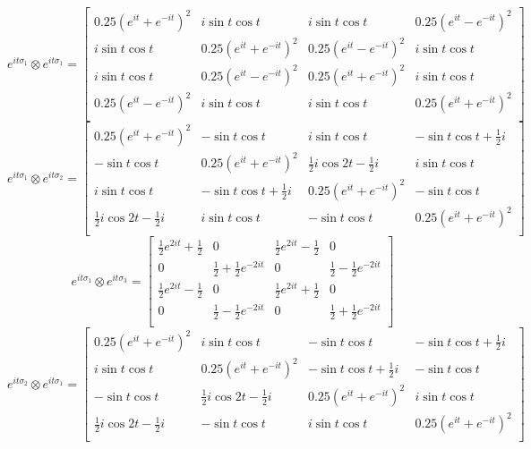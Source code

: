 \documentclass{article}
\begin{document}
\[ e^{it\sigma_1} \otimes e^{it\sigma_1} =  \left[
    \begin{array}{cccc}
    0.25(e^{it} + e^{-it})^2 & i\sin{t}\cos{t} & i\sin{t}\cos{t} & 0.25(e^{it} - e^{-it})^2 \\
    i\sin{t}\cos{t} & 0.25(e^{it} + e^{-it})^2 & 0.25(e^{it} - e^{-it})^2 & i\sin{t}\cos{t} \\
    i\sin{t}\cos{t} & 0.25(e^{it} - e^{-it})^2 & 0.25(e^{it} + e^{-it})^2 & i\sin{t}\cos{t} \\
    0.25(e^{it} - e^{-it})^2 & i\sin{t}\cos{t} & i\sin{t}\cos{t} & 0.25(e^{it} + e^{-it})^2 \\
    \end{array}
    \right]  \]
\[ e^{it\sigma_1} \otimes e^{it\sigma_2} = \left[
    \begin{array}{cccc}
    0.25(e^{it} + e^{-it})^2 & -\sin{t}\cos{t} & i\sin{t}\cos{t} & -\sin{t}\cos{t} + \frac{1}{2}i \\
    -\sin{t}\cos{t} & 0.25(e^{it} + e^{-it})^2 & \frac{1}{2}i\cos{2t} - \frac{1}{2}i & i\sin{t}\cos{t} \\
    i\sin{t}\cos{t} & -\sin{t}\cos{t} + \frac{1}{2}i & 0.25(e^{it} + e^{-it})^2 & -\sin{t}\cos{t} \\
    \frac{1}{2}i\cos{2t} - \frac{1}{2}i & i\sin{t}\cos{t} & -\sin{t}\cos{t} & 0.25(e^{it} + e^{-it})^2 \\
    \end{array}
    \right] \]
\[ e^{it\sigma_1} \otimes e^{it\sigma_3} = \left[
    \begin{array}{cccc}
    \frac{1}{2}e^{2it} + \frac{1}{2} & 0 & \frac{1}{2}e^{2it} - \frac{1}{2} & 0 \\
    0 & \frac{1}{2} + \frac{1}{2}e^{-2it} & 0 & \frac{1}{2} - \frac{1}{2}e^{-2it} \\
    \frac{1}{2}e^{2it} - \frac{1}{2} & 0 & \frac{1}{2}e^{2it} + \frac{1}{2} & 0 \\
    0 & \frac{1}{2} - \frac{1}{2}e^{-2it} & 0 & \frac{1}{2} + \frac{1}{2}e^{-2it} \\
    \end{array}
    \right] \]
\[ e^{it\sigma_2} \otimes e^{it\sigma_1} =   \left[
    \begin{array}{cccc}
    0.25(e^{it} + e^{-it})^2 & i\sin{t}\cos{t} & -\sin{t}\cos{t} & -\sin{t}\cos{t} + \frac{1}{2}i \\
    i\sin{t}\cos{t} & 0.25(e^{it} + e^{-it})^2 & -\sin{t}\cos{t} + \frac{1}{2}i & -\sin{t}\cos{t} \\
    -\sin{t}\cos{t} & \frac{1}{2}i\cos{2t} - \frac{1}{2}i & 0.25(e^{it} + e^{-it})^2 & i\sin{t}\cos{t} \\
    \frac{1}{2}i\cos{2t} - \frac{1}{2}i & -\sin{t}\cos{t} & i\sin{t}\cos{t} & 0.25(e^{it} + e^{-it})^2 \\
    \end{array}
    \right]  \]
\end{document}

